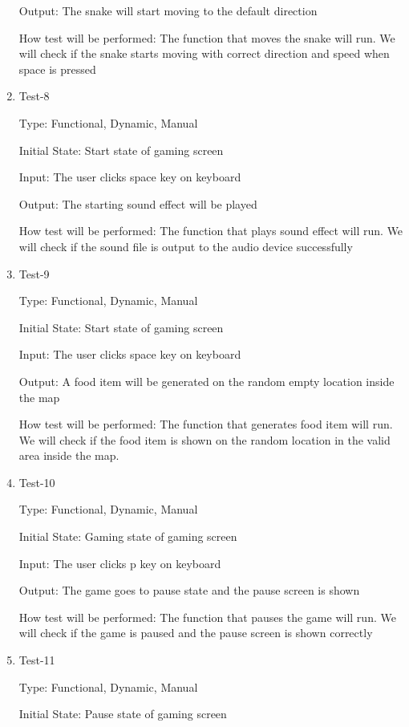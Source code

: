 \documentclass[12pt, titlepage]{article}
\begin{document}
\begin{enumerate}
Output: The snake will start moving to the default direction

How test will be performed: The function that moves the snake will run. We will check if the snake starts moving with correct direction and speed when space is pressed

\item{Test-8\\}

Type: Functional, Dynamic, Manual

Initial State: Start state of gaming screen

Input: The user clicks space key on keyboard

Output: The starting sound effect will be played

How test will be performed: The function that plays sound effect will run. We will check if the sound file is output to the audio device successfully

\item{Test-9\\}

Type: Functional, Dynamic, Manual

Initial State: Start state of gaming screen

Input: The user clicks space key on keyboard

Output: A food item will be generated on the random empty location inside the map

How test will be performed: The function that generates food item will run. We will check if the food item is shown on the random location in the valid area inside the map.

\item{Test-10\\}

Type: Functional, Dynamic, Manual

Initial State: Gaming state of gaming screen

Input: The user clicks p key on keyboard

Output: The game goes to pause state and the pause screen is shown

How test will be performed: The function that pauses the game will run. We will check if the game is paused and the pause screen is shown correctly

\item{Test-11\\}

Type: Functional, Dynamic, Manual

Initial State: Pause state of gaming screen


\end{enumerate}
\end{document}
